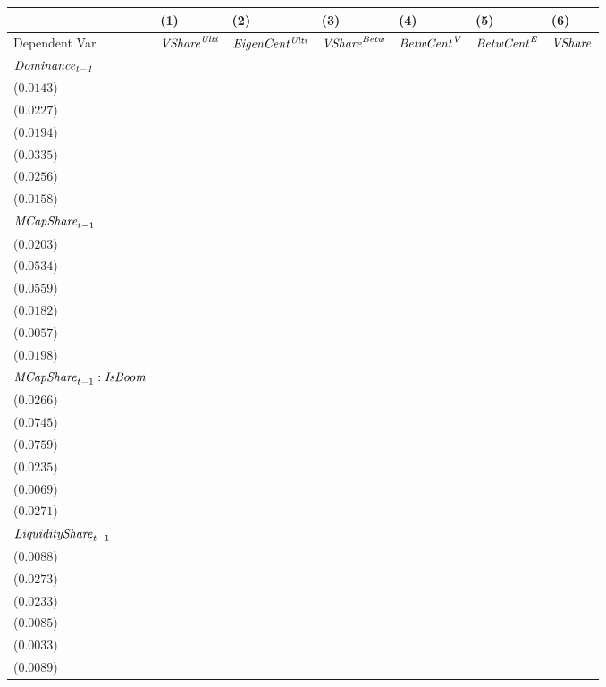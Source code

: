\begin{tabular}{lllllll}
\toprule
 & (1) & (2) & (3) & (4) & (5) & (6) \\
\midrule
Dependent Var & ${\it {VShare}^{\it Ulti}}$ & ${\it EigenCent^{\it Ulti}}$ & ${\it VShare}^{\it Betw}$ & ${\it BetwCent}^{\it V}$ & ${\it BetwCent}^{\it E}$ & ${\it VShare}$ \\
$\it Dominance_{t-1}$ & \makecell{$0.8597^{***}$ \\ ($0.0143$)} & \makecell{$0.7304^{***}$ \\ ($0.0227$)} & \makecell{$0.8227^{***}$ \\ ($0.0194$)} & \makecell{$0.7134^{***}$ \\ ($0.0335$)} & \makecell{$0.8328^{***}$ \\ ($0.0256$)} & \makecell{$0.8633^{***}$ \\ ($0.0158$)} \\
${\it MCapShare}_{t-1}$ & \makecell{$0.0104^{}$ \\ ($0.0203$)} & \makecell{$-0.0019^{}$ \\ ($0.0534$)} & \makecell{$-0.0623^{}$ \\ ($0.0559$)} & \makecell{$-0.0478^{***}$ \\ ($0.0182$)} & \makecell{$0.0119^{**}$ \\ ($0.0057$)} & \makecell{$0.0001^{}$ \\ ($0.0198$)} \\
${\it MCapShare}_{t-1}:{\it IsBoom}$ & \makecell{$0.0980^{***}$ \\ ($0.0266$)} & \makecell{$0.2045^{***}$ \\ ($0.0745$)} & \makecell{$0.2648^{***}$ \\ ($0.0759$)} & \makecell{$0.1025^{***}$ \\ ($0.0235$)} & \makecell{$0.0018^{}$ \\ ($0.0069$)} & \makecell{$0.1017^{***}$ \\ ($0.0271$)} \\
${\it LiquidityShare}_{t-1}$ & \makecell{$0.0377^{***}$ \\ ($0.0088$)} & \makecell{$0.0317^{}$ \\ ($0.0273$)} & \makecell{$0.1063^{***}$ \\ ($0.0233$)} & \makecell{$0.0121^{}$ \\ ($0.0085$)} & \makecell{$0.0139^{***}$ \\ ($0.0033$)} & \makecell{$0.0350^{***}$ \\ ($0.0089$)} \\

\end{tabular}
